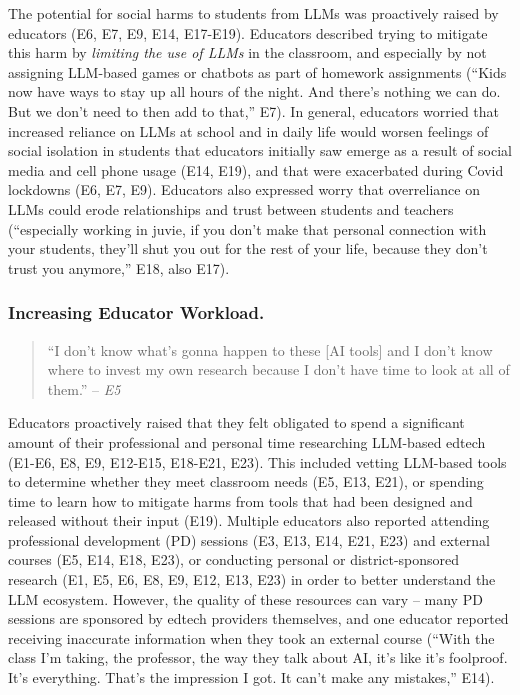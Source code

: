 \noindent The potential for social harms to students from LLMs was proactively raised by educators (E6, E7, E9, E14, E17-E19). Educators described trying to mitigate this harm by \textit{limiting the use of LLMs} in the classroom, and especially by not assigning LLM-based games or chatbots as part of homework assignments (``Kids now have ways to stay up all hours of the night. And there's nothing we can do. But we don't need to then add to that,'' E7). In general, educators worried that increased reliance on LLMs at school and in daily life would worsen feelings of social isolation in students that educators initially saw emerge as a result of social media and cell phone usage (E14, E19), and that were exacerbated during Covid lockdowns (E6, E7, E9). Educators also expressed worry that overreliance on LLMs could erode relationships and trust between students and teachers (``especially working in juvie, if you don't make that personal connection with your students, they'll shut you out for the rest of your life, because they don't trust you anymore,'' E18, also E17).  

\subsubsection*{Increasing Educator Workload.}
\begin{quote}
     ``I don't know what's gonna happen to these [AI tools] and I don't know where to invest my own research because I don't have time to look at all of them.'' -- \textit{E5}
\end{quote}

\noindent Educators proactively raised that they felt obligated to spend a significant amount of their professional and personal time researching LLM-based edtech (E1-E6, E8, E9, E12-E15, E18-E21, E23). This included vetting LLM-based tools to determine whether they meet classroom needs (E5, E13, E21), or spending time to learn how to mitigate harms from tools that had been designed and released without their input (E19). Multiple educators also reported attending professional development (PD) sessions (E3, E13, E14, E21, E23) and external courses (E5, E14, E18, E23), or conducting personal or district-sponsored research (E1, E5, E6, E8, E9, E12, E13, E23) in order to better understand the LLM ecosystem. However, the quality of these resources can vary -- many PD sessions are sponsored by edtech providers themselves, and one educator reported receiving inaccurate information when they took an external course (``With the class I’m taking, the professor, the way they talk about AI, it’s like it's foolproof. It’s everything. That's the impression I got. It can't make any mistakes,'' E14).

